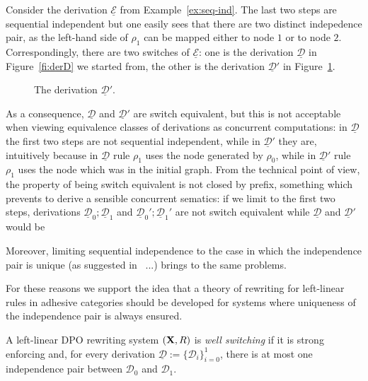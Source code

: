 \documentclass[a4paper,UKenglish,cleveref,pdftex,thm-restate,numberwithinsect,anonymous]{lipics}
\def\R{\mathsf{R}}
\def\X{\textbf {\textup{X}}}
\newcommand{\dder}[1]{\mathscr{#1}}
\newcommand{\der}[1]{\underline{\dder{#1}}}
\begin{document}
\begin{example}
  Consider the derivation $\der{E}$ from Example~\ref{ex:seq-ind}.
  The last two steps are sequential independent but one easily sees
  that there are two distinct indepedence pair, as the left-hand side
  of $\rho_1$ can be mapped either to node $1$ or to node
  $2$. Correspondingly, there
  are two switches of $\der{E}$: one is the derivation $\der{D}$ in
  Figure~\ref{fi:derD} we started from, the other is the derivation
  $\der{D}'$ in Figure~\ref{fi:derD1}.
  
  \begin{figure}
    
    \caption{The derivation $\der{D}'$.}
    \label{fi:derD1}
  \end{figure}
  
  As a consequence, $\der{D}$ and $\der{D}'$ are switch equivalent, but
  this is not acceptable when viewing equivalence classes of
  derivations as concurrent computations: in $\der{D}$ the first two
  steps are not sequential independent, while in $\der{D}'$ they are,
  intuitively because in $\der{D}$ rule $\rho_1$ uses the node
  generated by $\rho_0$, while in $\der{D}'$ rule $\rho_1$ uses the
  node which was in the initial graph. From the technical point of
  view, the property of being switch equivalent is not closed by
  prefix, something which prevents to derive a sensible concurrent
  sematics: if we limit to the first two steps, derivations
  $\der{D}_0; \der{D}_1$ and $\der{D}_0'; \der{D}_1'$ are not switch
  equivalent while $\der{D}$ and $\der{D}'$ would be
\end{example} 

Moreover, limiting sequential independence to the case in which the independence
pair is unique (as suggested in~ ...) brings to the same problems.

For these reasons we support the idea that a theory of rewriting for
left-linear rules in adhesive categories should be developed for
systems where uniqueness of the independence pair is always ensured.




\begin{definition}
A left-linear DPO rewriting system $(\X, \R)$ is \emph{well switching} if it is strong enforcing and, for every derivation $\der{D}:=\{\dder{D}_{i}\}_{i=0}^1$, there is at most one independence pair between $\dder{D}_0$ and $\dder{D}_1$.
\end{definition}
\end{document}

